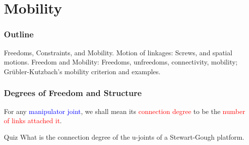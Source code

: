 \section{Mobility}

\begin{frame}
	\frametitle{Outline}
	\begin{tcolorbox}[coltitle=yellow!50!black,colframe=magenta!25,split=.2,title=Freedom and Structure]
		Freedoms, Constraints, and Mobility.
		\tcblower
		Motion of linkages: Screws, and spatial motions.
		\vspace{.2cm}
		\newline
		Freedom and Mobility: Freedoms, unfreedoms, connectivity, mobility;
		\vspace{.2cm}
		\newline
		Gr{\"u}bler-Kutzbach's mobility criterion and examples.
	\end{tcolorbox}
\end{frame}
 


\begin{frame}
	\frametitle{Degrees of Freedom and Structure}
	\begin{definition}
		For any  \textcolor{blue}{manipulator joint}, we shall mean its \textcolor{red}{connection degree} to be the \textcolor{red}{number of links attached it}.
	\end{definition}
	\begin{block}{Quiz}
		What is the connection degree of the u-joints of a Stewart-Gough platform.
	\end{block}
\end{frame}


